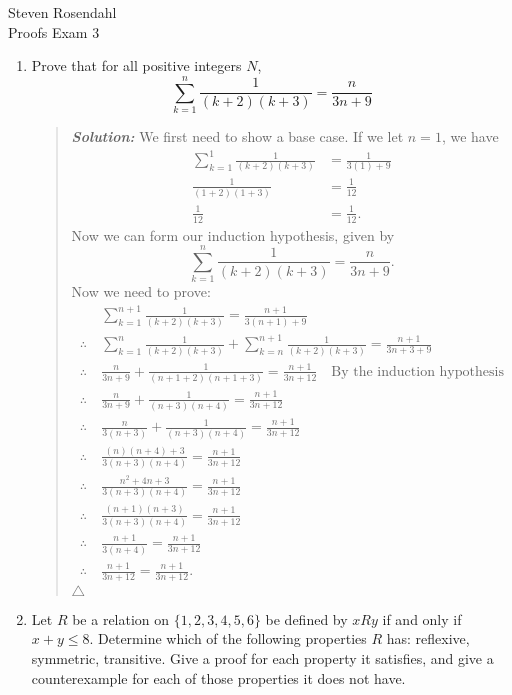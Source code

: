 \documentclass{article}
\newcommand{\SLN}{\indent\textit{\textbf{Solution: }}}
\begin{document}
\noindent Steven Rosendahl\\
Proofs Exam 3
\vspace{1cm}
\begin{enumerate}
\item Prove that for all positive integers $N$,
\[
\sum_{k=1}^{n}\frac{1}{(k+2)(k+3)} = \frac{n}{3n + 9}
\]
\begin{quote}
\SLN
\noindent We first need to show a base case. If we let $n = 1$, we have
\begin{align*}
\sum_{k=1}^{1}\frac{1}{(k+2)(k+3)} &= \frac{1}{3(1) + 9}\\
\frac{1}{(1 + 2)(1 + 3)} &= \frac{1}{12}\\
\frac{1}{12} &= \frac{1}{12}.
\end{align*}
\noindent Now we can form our induction hypothesis, given by
\[\sum_{k=1}^{n}\frac{1}{(k+2)(k+3)} = \frac{n}{3n + 9}.\]
\noindent Now we need to prove:
\begin{align*}
&\ \sum_{k=1}^{n + 1}\frac{1}{(k+2)(k+3)} = \frac{n + 1}{3(n + 1) + 9}\\
\therefore&\ \sum_{k = 1}^{n}\frac{1}{(k+2)(k+3)} + \sum_{k = n}^{n+1}\frac{1}{(k+2)(k+3)} = \frac{n + 1}{3n + 3 + 9}\\
\therefore&\ \frac{n}{3n + 9} + \frac{1}{(n + 1 + 2)(n + 1 + 3)} = \frac{n + 1}{3n + 12} \quad\text{By the induction hypothesis}\\
\therefore&\ \frac{n}{3n + 9} + \frac{1}{(n+3)(n+4)} = \frac{n + 1}{3n + 12}\\
\therefore&\ \frac{n}{3(n + 3)} + \frac{1}{(n+3)(n+4)} = \frac{n + 1}{3n + 12}\\
\therefore&\ \frac{(n)(n+4) + 3}{3(n+3)(n+4)} = \frac{n + 1}{3n + 12}\\
\therefore&\ \frac{n^{2} + 4n + 3}{3(n+3)(n+4)} = \frac{n + 1}{3n + 12}\\
\therefore&\ \frac{(n+1)(n+3)}{3(n+3)(n+4)} = \frac{n + 1}{3n + 12}\\
\therefore&\ \frac{n+1}{3(n+4)} = \frac{n + 1}{3n + 12}\\
\therefore&\ \frac{n+1}{3n + 12} = \frac{n + 1}{3n + 12}.
\end{align*}
$\triangle$
\end{quote}
\newpage
\item Let $R$ be a relation on $\{1,2,3,4,5,6\}$ be defined by $xRy$ if and only if $x + y \leq 8$. Determine which of the following properties $R$ has: reflexive, symmetric, transitive. Give a proof for each property it satisfies, and give a counterexample for each of those properties it does not have.

\end{enumerate}
\end{document}
